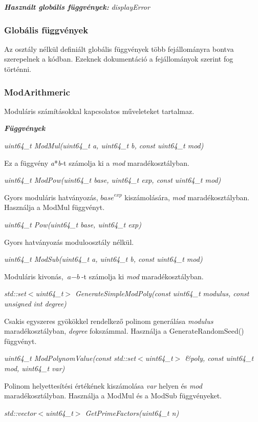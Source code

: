 \documentclass[hidelinks, 12pt]{article}
\begin{document}
\textit{\textbf{Használt globális függvények: }}\textit{displayError}

\subsubsection{Globális függvények}
Az osztály nélkül definiált globális függvények több fejállományra bontva szerepelnek a kódban. Ezeknek dokumentáció a fejállományok szerint fog történni.

\subsubsection*{ModArithmeric}
Moduláris számításokkal kapcsolatos műveleteket tartalmaz.

\textit{\textbf{Függvények}}

\textit{uint64\_t ModMul(uint64\_t a, uint64\_t b, const uint64\_t mod)}

Ez a függvény \textit{a}*\textit{b}-t számolja ki a \textit{mod} 
maradékosztályban.

\textit{uint64\_t ModPow(uint64\_t base, uint64\_t exp, const uint64\_t mod)}

Gyors moduláris hatványozás, $\textit{base}^\textit{exp}$ kiszámolására, \textit{mod} maradékosztályban. Használja a ModMul függvényt.

\textit{uint64\_t Pow(uint64\_t base, uint64\_t exp)}

Gyors hatványozás moduloosztály nélkül.

\textit{uint64\_t ModSub(uint64\_t a, uint64\_t b, const uint64\_t mod)}

Moduláris kivonás, $\textit{a}-\textit{b}$-t számolja ki \textit{mod} maradékosztályban.

\textit{std::set$<$uint64\_t$>$ GenerateSimpleModPoly(const uint64\_t modulus, const unsigned int degree)}

Csakis egyszeres gyökökkel rendelkező polinom generálása \textit{modulus} maradékosztályban, \textit{degree} fokszámmal. Használja a GenerateRandomSeed() függvényt.

\textit{uint64\_t ModPolynomValue(const std::set$<$uint64\_t$>$ \&poly, const uint64\_t mod, uint64\_t var)}

Polinom helyettesítési értékének kiszámolása \textit{var} helyen és \textit{mod} maradékosztályban. Használja a ModMul és a ModSub függvényeket.

\textit{std::vector$<$uint64\_t$>$ GetPrimeFactors(uint64\_t n)}
\end{document}
